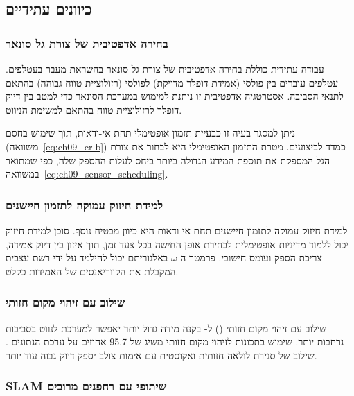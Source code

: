 \subsection{כיוונים עתידיים}
\label{sec:ch09_future_work}

\subsubsection{בחירה אדפטיבית של צורת גל סונאר}
\label{sec:ch09_adaptive_waveform}

עבודה עתידית כוללת בחירה אדפטיבית של צורת גל סונאר בהשראת מעבר  בעטלפים. עטלפים עוברים בין פולסי  (אמידת דופלר מדויקת) לפולסי  (רזולוציית טווח גבוהה) בהתאם לתנאי הסביבה. אסטרטגיה אדפטיבית זו ניתנת למימוש במערכת הסונאר כדי למטב בין דיוק דופלר לרזולוציית טווח בהתאם למשימת הניווט.

ניתן למסגר בעיה זו כבעיית תזמון אופטימלי תחת אי-ודאות, תוך שימוש בחסם  (משוואה~\ref{eq:ch09_crlb}) כמדד לביצועים. מטרת התזמון האופטימלי היא לבחור את צורת הגל המספקת את תוספת המידע הגדולה ביותר ביחס לעלות ההספק שלה, כפי שמתואר במשוואה~\ref{eq:ch09_sensor_scheduling}.

\subsubsection{למידת חיזוק עמוקה לתזמון חיישנים}
\label{sec:ch09_rl_scheduling}

למידת חיזוק עמוקה לתזמון חיישנים תחת אי-ודאות היא כיוון מבטיח נוסף. סוכן למידת חיזוק יכול ללמוד מדיניות אופטימלית לבחירת אופן החישה בכל צעד זמן, תוך איזון בין דיוק אמידה, צריכת הספק ועומס חישובי. פרמטר ה-$\omega$ באלגוריתם  יכול להילמד על ידי רשת עצבית המקבלת את הקווריאנסים של האמידות כקלט.

\subsubsection{שילוב עם זיהוי מקום חזותי}
\label{sec:ch09_visual_place}

שילוב עם זיהוי מקום חזותי () ל- בקנה מידה גדול יותר יאפשר למערכת לנווט בסביבות נרחבות יותר. שימוש בתכונות  לזיהוי מקום חזותי משיג  של 95.7 אחוזים על ערכת הנתונים  \cite{CrewAIDocs}. שילוב של סגירת לולאה חזותית ואקוסטית עם אימות צולב יספק דיוק גבוה עוד יותר.

\subsubsection{SLAM שיתופי עם רחפנים מרובים}
\label{sec:ch09_multi_drone}

